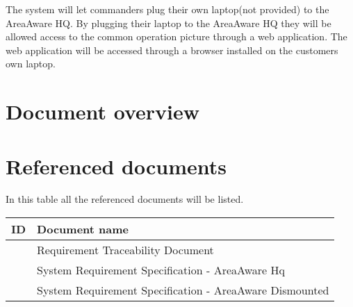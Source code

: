 The system will let commanders plug their own laptop(not provided) to the AreaAware HQ.
By plugging their laptop to the AreaAware HQ they will be allowed access to the common operation picture through a web application. 
The web application will be accessed through a browser installed on the customers own laptop.


\section{Document overview}


\section{Referenced documents}
In this table all the referenced documents will be listed.

\begin{tabular}{b{6cm} b{7cm}}
	\textbf{ID} & \textbf{Document name} \\
	\hline
	\rtm & Requirement Traceability Document \\
	\srshq & System Requirement Specification - AreaAware Hq \\
	\srsdis & System Requirement Specification - AreaAware Dismounted \\
\end{tabular}